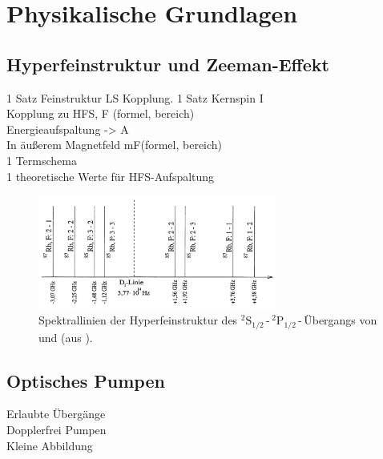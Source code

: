 \section{Physikalische Grundlagen}

\subsection{Hyperfeinstruktur und Zeeman-Effekt}
1 Satz Feinstruktur LS Kopplung. 1 Satz Kernspin I \\
Kopplung zu HFS, F (formel, bereich) \\
Energieaufspaltung -> A \\
In äußerem Magnetfeld mF(formel, bereich) \\
1 Termschema \\
1 theoretische Werte für HFS-Aufspaltung


\begin{figure}[H]
\begin{center}
  \includegraphics[width=0.7\textwidth]{../img/HFSspect_theo.png}
  \caption{Spektrallinien der Hyperfeinstruktur des ${}^2\text{S}_{1/2}$\,-\,${}^2\text{P}_{1/2}$\,-\,Übergangs
  von  und  (aus \cite{manual}).}
  \label{img:hfsspectrum}
\end{center}
\end{figure} 

\subsection{Optisches Pumpen}
Erlaubte Übergänge \\
Dopplerfrei Pumpen \\
Kleine Abbildung 

